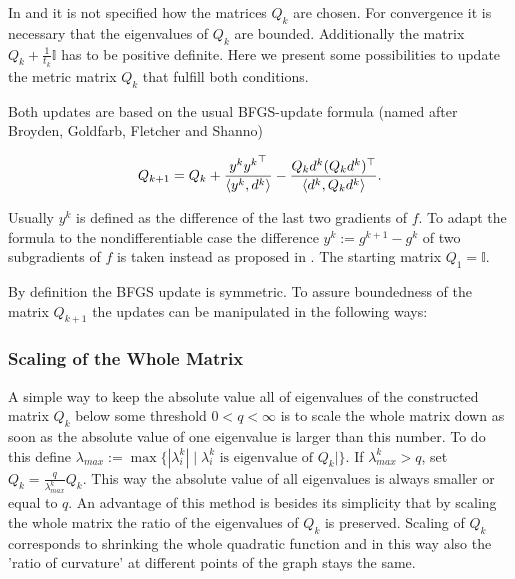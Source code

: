 
In \cite{Noll2012} and \cite{Noll2013} it is not specified how the matrices \(Q_k\) are chosen.
For convergence it is necessary that the eigenvalues of \(Q_k\) are bounded. Additionally the matrix \(Q_k+\frac{1}{t_k}\mathbb{I}\) has to be positive definite.
Here we present some possibilities to update the metric matrix \(Q_k\) that fulfill both conditions.

Both updates are based on the usual BFGS-update formula (named after Broyden, Goldfarb, Fletcher and Shanno)

\begin{equation}
	Q_{k+1} = Q_k + \frac{y^k{y^k}^{\top}}{\left\langle y^k,d^k\right\rangle}-\frac{Q_kd^k(Q_kd^k)^{\top}}{\left\langle d^k,Q_kd^k \right\rangle}.
	\label{BFGS_update}
\end{equation}

Usually \(y^k\) is defined as the difference of the last two gradients of \(f\). To adapt the formula to the nondifferentiable case the difference \(y^k := g^{k+1}-g^k\) of two subgradients of \(f\) is taken instead as proposed in \cite{Haarala2007}.
The starting matrix \(Q_1 = \mathbb{I}\).


By definition the BFGS update is symmetric. To assure boundedness of the matrix \(Q_{k+1}\) the updates can be manipulated in the following ways:

\subsubsection{Scaling of the Whole Matrix}

A simple way to keep the absolute value all of eigenvalues of the constructed matrix \(Q_k\) below some threshold \(0 < q < \infty\) is to scale the whole matrix down as soon as the absolute value of one eigenvalue is larger than this number.
To do this define \(\lambda_{max} := \max\{|\lambda_i^k|\mid \lambda^k_i \text{ is eigenvalue of } Q_k|\}\). If  \(\lambda^k_{max} > q\), set \(Q_k = \frac{q}{\lambda^k_{max}}Q_k\). This way the absolute value of all eigenvalues is always smaller or equal to \(q\).
An advantage of this method is besides its simplicity that by scaling the whole matrix the ratio of the eigenvalues of \(Q_k\) is preserved. Scaling of \(Q_k\) corresponds to shrinking the whole quadratic function and in this way also the 'ratio of curvature' at different points of the graph stays the same. 

